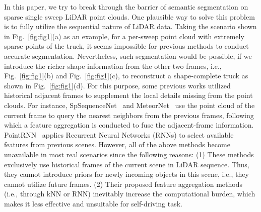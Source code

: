 \documentclass[letterpaper]{article} \usepackage{aaai21}  \usepackage{times}  \usepackage{helvet} \usepackage{courier}  \usepackage[hyphens]{url}  \usepackage{graphicx} \urlstyle{rm} \def\UrlFont{\rm}  \usepackage{natbib}  \usepackage{booktabs}
\begin{document}
In this paper, we try to break through the barrier of semantic segmentation on sparse single sweep LiDAR point clouds. 
One plausible way to solve this problem is to fully utilize the sequential nature of LiDAR data. 
Taking the scenario shown in Fig.~\ref{fig:fig1}(a) as an example, for a per-sweep point cloud with extremely sparse points of the truck, it seems impossible for previous methods to conduct accurate segmentation. Nevertheless, such segmentation would be possible, if we introduce the richer shape information from the other two frames, i.e., Fig.~\ref{fig:fig1}(b) and Fig.~\ref{fig:fig1}(c), to reconstruct a shape-complete truck as shown in Fig.~\ref{fig:fig1}(d).
For this purpose, some previous works utilized historical adjacent frames to supplement the local details missing from the point clouds. 
For instance, SpSequenceNet~\cite{shi2020spsequencenet} and MeteorNet~\cite{liu2019meteornet} use the point cloud of the current frame to query the nearest neighbors from the previous frames, following which a feature aggregation is conducted to fuse the adjacent-frame information.
PointRNN~\cite{fan2019pointrnn} applies Recurrent Neural Networks (RNNs) to select available features from previous scenes.
However, all of the above methods become unavailable in most real scenarios since the following reasons: 
(1) These methods exclusively use historical frames of the current scene in LiDAR sequence. 
Thus, they cannot introduce priors for newly incoming objects in this scene, i.e., they cannot utilize future frames. 
(2) Their proposed feature aggregation methods (i.e., through kNN or RNN) inevitably increase the computational burden, which makes it less effective and unsuitable for self-driving task.
	
\end{document}
